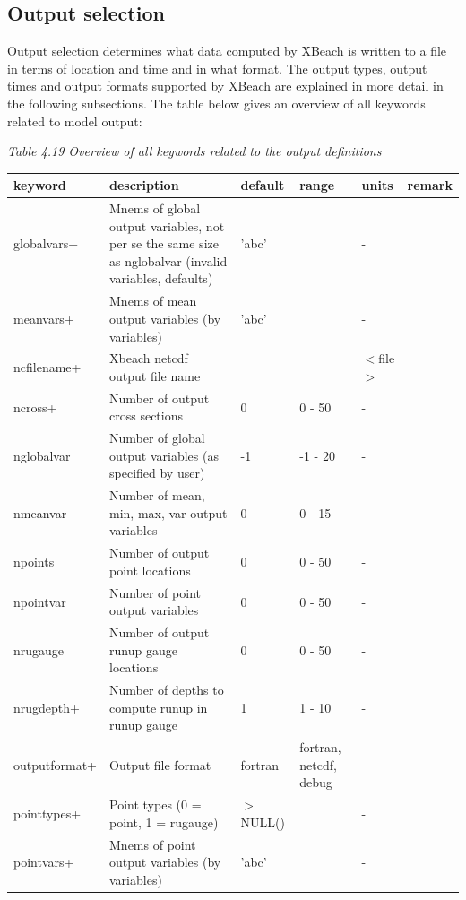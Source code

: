 \documentclass{article}
\begin{document}
\subsection{ Output selection}

\noindent Output selection determines what data computed by XBeach is written to a file in terms of location and time and in what format. The output types, output times and output formats supported by XBeach are explained in more detail in the following subsections. The table below gives an overview of all keywords related to model output:

\noindent \textit{Table 4.19 Overview of all keywords related to the output definitions}

\begin{tabular}{|p{0.8in}|p{1.0in}|p{0.6in}|p{0.7in}|p{0.5in}|p{0.6in}|} \hline 
keyword & description\textbf{} & default & range & units & remark \\ \hline 
globalvars+ & Mnems of global output variables, not per se the same size as nglobalvar (invalid variables, defaults) & 'abc' &  & - &  \\ \hline 
meanvars+ & Mnems of mean output variables (by variables) & 'abc' &  & - &  \\ \hline 
ncfilename+ & Xbeach netcdf output file name &  &  & $<$file$>$ &  \\ \hline 
ncross+ & Number of output cross sections & 0 & 0 - 50 & - &  \\ \hline 
nglobalvar & Number of global output variables (as specified by user) & -1 & -1 - 20 & - &  \\ \hline 
nmeanvar & Number of mean, min, max, var output variables & 0 & 0 - 15 & - &  \\ \hline 
npoints & Number of output point locations & 0 & 0 - 50 & - &  \\ \hline 
npointvar & Number of point output variables & 0 & 0 - 50 & - &  \\ \hline 
nrugauge & Number of output runup gauge locations & 0 & 0 - 50 & - &  \\ \hline 
nrugdepth+ & Number of depths to compute runup in runup gauge & 1 & 1 - 10 & - &  \\ \hline 
outputformat+ & Output file format & fortran & fortran, netcdf, debug &  &  \\ \hline 
pointtypes+ & Point types (0 = point, 1 = rugauge) & $>$ NULL() &  & - &  \\ \hline 
pointvars+ & Mnems of point output variables (by variables) & 'abc' &  & - &  \\ \hline 

\end{tabular}
\end{document}
